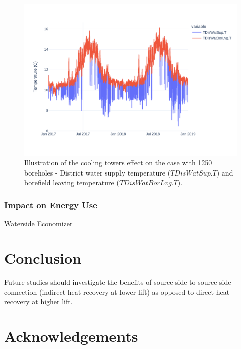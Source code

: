 \begin{figure}[!htbp]
\centering
\includegraphics[width=\linewidth]{../python_scripts/figures/GeoBestCaseT.pdf}
\caption{Illustration of the cooling towers effect on the case with 1250 boreholes - District water supply temperature ($TDisWatSup.T$) and borefield leaving temperature ($TDisWatBorLvg.T$).}
\label{fig:coolingeffect}
\end{figure}


\subsubsection{Impact on Energy Use} \label{sec:energy}

Waterside Economizer







\section{Conclusion} \label{sec:concl}


Future studies should investigate the benefits of source-side to source-side connection (indirect heat recovery at lower lift) as opposed to direct heat recovery at higher lift.

\section{Acknowledgements} \label{sec:acknowledge}
